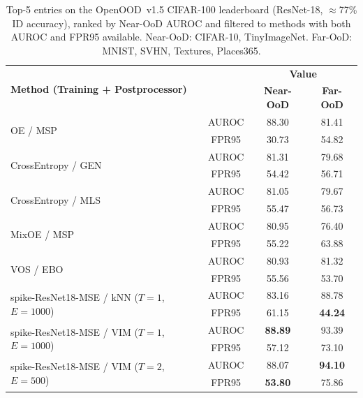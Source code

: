 \documentclass{ieeeaccess}
\newcommand{\fprname}{\cellcolor{labelgray}\scriptsize\hspace{0.3em}FPR95}
\newcommand{\aurocname}{\cellcolor{labelgray}\scriptsize AUROC}
\begin{document}
\begin{table}[!htb]
\caption{Top-5 entries on the OpenOOD~v1.5 CIFAR-100 leaderboard (ResNet-18, $\approx$77\% ID accuracy), ranked by Near-OoD AUROC and filtered to methods with both AUROC and FPR95 available. Near-OoD: CIFAR-10, TinyImageNet. Far-OoD: MNIST, SVHN, Textures, Places365.}
\begin{center}
\small
\begin{tabular}{p{6.2cm}c|c|c}
\multirow{2}{*}{\textbf{Method (Training + Postprocessor)}} & \multirow{2}{*}{}
  & \multicolumn{2}{c}{\textbf{Value}} \\
  & & \textbf{Near-OoD} & \textbf{Far-OoD} \\
\hline
\multirow{2}{*}{OE / MSP \cite{hendrycks2018deep, hendrycks2017baseline}} & \aurocname & 88.30 & 81.41 \\
 & \fprname & 30.73 & 54.82 \\
\hline
\multirow{2}{*}{CrossEntropy / GEN \cite{10203747}} & \aurocname & 81.31 & 79.68 \\
 & \fprname & 54.42 & 56.71 \\
\hline
\multirow{2}{*}{CrossEntropy / MLS} & \aurocname & 81.05 & 79.67 \\
 & \fprname & 55.47 & 56.73 \\
\hline
\multirow{2}{*}{MixOE / MSP \cite{Zhang_2023_WACV, hendrycks2017baseline}} & \aurocname & 80.95 & 76.40 \\
 & \fprname & 55.22 & 63.88 \\
\hline
\multirow{2}{*}{VOS / EBO \cite{du2022towards, NEURIPS2020_f5496252}} & \aurocname & 80.93 & 81.32 \\
 & \fprname & 55.56 & 53.70 \\
\hline
\hline
\multirow{2}{*}{spike-ResNet18-MSE / kNN ($T{=}1$, $E{=}1000$)} & \aurocname & 83.16 & 88.78 \\
 & \fprname & 61.15 & \textbf{44.24} \\
\hline
\multirow{2}{*}{spike-ResNet18-MSE / VIM ($T{=}1$, $E{=}1000$)} & \aurocname & \textbf{88.89} & 93.39 \\
 & \fprname & 57.12 & 73.10 \\
\hline
\multirow{2}{*}{spike-ResNet18-MSE / VIM ($T{=}2$, $E{=}500$)} & \aurocname & 88.07 & \textbf{94.10} \\
 & \fprname & \textbf{53.80} & 75.86 \\
\end{tabular}
\label{tab:openood-cifar100}
\end{center}
\end{table}
\end{document}
